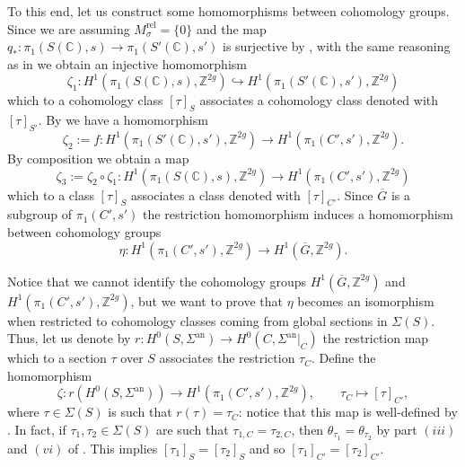 \documentclass[10 pt,a4paper]{article}
\theoremstyle{plain}
\theoremstyle{definition}
\theoremstyle{named}
\newcommand{\bC}{\mathbb C}
\newcommand{\bZ}{\mathbb Z}
\DeclareMathOperator{\an}{an}
\begin{document}
    To this end, let us construct some homomorphisms between cohomology groups. Since we are assuming $M_\sigma^\textrm{rel}=\{0\}$ and the map $q_*:\pi_1(S(\bC),s) \to \pi_1(S'(\bC),s')$ is surjective by , with the same reasoning as in  we obtain an injective homomorphism
    \[
    \zeta_1:H^1(\pi_1(S(\bC),s),\bZ^{2g}) \hookrightarrow H^1(\pi_1(S'(\bC),s'),\bZ^{2g})
    \]
    which to a cohomology class $[\tau]_S$ associates a cohomology class denoted with $[\tau]_{S'}$. By  we have a homomorphism
    \[
    \zeta_2:=f: H^1(\pi_1(S'(\bC),s'),\bZ^{2g}) \to H^1(\pi_1(C',s'),\bZ^{2g}).
    \]
    By composition we obtain a map
    \[
    \zeta_3:=\zeta_2\circ \zeta_1:H^1(\pi_1(S(\bC),s),\bZ^{2g}) \to H^1(\pi_1(C',s'),\bZ^{2g})
    \]
    which to a class $[\tau]_S$ associates a class denoted with $[\tau]_{C'}$. Since $\overline{G}$ is a subgroup of $\pi_1(C',s')$ the restriction homomorphism induces a homomorphism between cohomology groups
    \[
    \eta:H^1(\pi_1(C',s'),\bZ^{2g}) \to H^1(\overline{G},\bZ^{2g}).
    \]

    Notice that we cannot identify the cohomology groups $H^1(\overline{G},\bZ^{2g})$ and $H^1(\pi_1(C',s'),\bZ^{2g})$, but we want to prove that $\eta$ becomes an isomorphism when restricted to cohomology classes coming from global sections in $\Sigma(S)$. Thus, let us denote by $r:H^0(S,\Sigma^{\an}) \to H^0(C,\Sigma^{\an}|_C)$ the restriction map which to a section $\tau$ over $S$ associates the restriction $\tau_C$. Define the homomorphism
    \[
    \zeta:r(H^0(S,\Sigma^{\an})) \to H^1(\pi_1(C',s'),\bZ^{2g}), \qquad \tau_C \mapsto [\tau]_{C'},
    \]
    where $\tau \in \Sigma(S)$ is such that $r(\tau)=\tau_C$: notice that this map is well-defined by . In fact, if $\tau_1, \tau_2 \in \Sigma(S)$ are such that $\tau_{1,C} = \tau_{2,C}$, then $\theta_{\tau_1}=\theta_{\tau_2}$ by part $(iii)$ and $(vi)$ of . This implies $[\tau_1]_S=[\tau_2]_S$ and so $[\tau_1]_{C'}=[\tau_2]_{C'}$.
\end{document}
